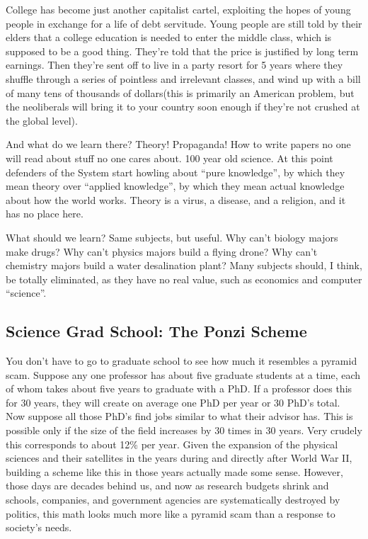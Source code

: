 College has become just another capitalist cartel, exploiting the hopes
of young people in exchange for a life of debt servitude. Young people
are still told by their elders that a college education is needed to
enter the middle class, which is supposed to be a good thing. They're
told that the price is justified by long term earnings. Then they're
sent off to live in a party resort for 5 years where they shuffle
through a series of pointless and irrelevant classes, and wind up with a
bill of many tens of thousands of dollars(this is primarily an American
problem, but the neoliberals will bring it to your country soon enough
if they're not crushed at the global level).

And what do we learn there? Theory! Propaganda! How to write papers no
one will read about stuff no one cares about. 100 year old science. At
this point defenders of the System start howling about ``pure
knowledge'', by which they mean theory over ``applied knowledge'', by
which they mean actual knowledge about how the world works. Theory is a
virus, a disease, and a religion, and it has no place here.

What should we learn? Same subjects, but useful. Why can't biology
majors make drugs? Why can't physics majors build a flying drone? Why
can't chemistry majors build a water desalination plant? Many subjects
should, I think, be totally eliminated, as they have no real value, such
as economics and computer ``science''.

\subsection{Science Grad School: The Ponzi
Scheme}\label{science-grad-school-the-ponzi-scheme}

You don't have to go to graduate school to see how much it resembles a
pyramid scam. Suppose any one professor has about five graduate students
at a time, each of whom takes about five years to graduate with a PhD.
If a professor does this for 30 years, they will create on average one
PhD per year or 30 PhD's total. Now suppose all those PhD's find jobs
similar to what their advisor has. This is possible only if the size of
the field increases by 30 times in 30 years. Very crudely this
corresponds to about 12\% per year. Given the expansion of the physical
sciences and their satellites in the years during and directly after
World War II, building a scheme like this in those years actually made
some sense. However, those days are decades behind us, and now as
research budgets shrink and schools, companies, and government agencies
are systematically destroyed by politics, this math looks much more like
a pyramid scam than a response to society's needs.

